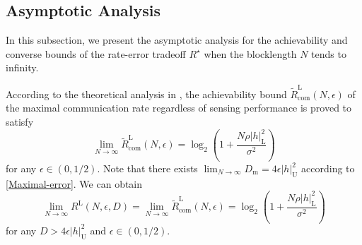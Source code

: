 \documentclass[conference,a4paper]{IEEEtran}
\begin{document}

\subsection{Asymptotic Analysis}
In this subsection, we present the asymptotic analysis for the achievability and converse bounds of the rate-error tradeoff $R^\star$ when the blocklength $N$ tends to infinity.

According to the theoretical analysis in \cite{YanDurKoc:C13}, the achievability bound $\tilde{R}^\mathrm{L}_\mathrm{com}(N,\epsilon)$ of the maximal communication rate regardless of sensing performance is proved to satisfy
\begin{equation}
    \lim_{N\to\infty}\tilde{R}^\mathrm{L}_\mathrm{com}(N,\epsilon) = \log_2(1+\frac{N\rho|h|_\mathrm{L}^2}{\sigma^2}) 
\end{equation}
for any $\epsilon\in(0,1/2)$. Note that there exists $\lim_{N\to\infty} D_\mathrm{m} = 4\epsilon|h|_\mathrm{U}^2$ according to \eqref{Maximal-error}. We can obtain
\begin{equation}
    \lim_{N\to \infty}R^\mathrm{L}(N,\epsilon,D) =  \lim_{N\to\infty}\tilde{R}^\mathrm{L}_\mathrm{com}(N,\epsilon) = \log_2(1+\frac{N\rho|h|_\mathrm{L}^2}{\sigma^2}) 
\end{equation}
for any $D> 4\epsilon|h|_\mathrm{U}^2$ and $\epsilon\in(0,1/2)$. 
\end{document}
